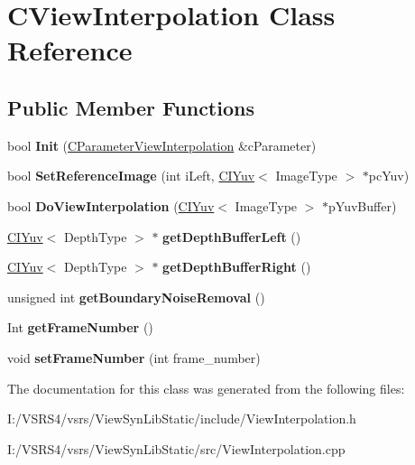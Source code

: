 \hypertarget{class_c_view_interpolation}{}\section{C\+View\+Interpolation Class Reference}
\label{class_c_view_interpolation}
\subsection*{Public Member Functions}
\begin{DoxyCompactItemize}
\item 
\mbox{\label{class_c_view_interpolation_a6880b1f44b9e895e884a079ee116e186}} 
bool {\bfseries Init} (\hyperlink{class_c_parameter_view_interpolation}{C\+Parameter\+View\+Interpolation} \&c\+Parameter)
\item 
\mbox{\label{class_c_view_interpolation_ac6fcdc3971b4023c7ea8932680c82f40}} 
bool {\bfseries Set\+Reference\+Image} (int i\+Left, \hyperlink{class_c_i_yuv}{C\+I\+Yuv}$<$ Image\+Type $>$ $\ast$pc\+Yuv)
\item 
\mbox{\label{class_c_view_interpolation_a5ae50ca08408d1a388dc607b65896d46}} 
bool {\bfseries Do\+View\+Interpolation} (\hyperlink{class_c_i_yuv}{C\+I\+Yuv}$<$ Image\+Type $>$ $\ast$p\+Yuv\+Buffer)
\item 
\mbox{\label{class_c_view_interpolation_a70574d7efb5a1a83308644db864341f5}} 
\hyperlink{class_c_i_yuv}{C\+I\+Yuv}$<$ Depth\+Type $>$ $\ast$ {\bfseries get\+Depth\+Buffer\+Left} ()
\item 
\mbox{\label{class_c_view_interpolation_a8128239185bdf5a1cef0849fa1743f55}} 
\hyperlink{class_c_i_yuv}{C\+I\+Yuv}$<$ Depth\+Type $>$ $\ast$ {\bfseries get\+Depth\+Buffer\+Right} ()
\item 
\mbox{\label{class_c_view_interpolation_a448b47edb9eb691ee514ef531d484c44}} 
unsigned int {\bfseries get\+Boundary\+Noise\+Removal} ()
\item 
\mbox{\label{class_c_view_interpolation_a02fc74d6bf654a9764a6f9dd4f43328e}} 
Int {\bfseries get\+Frame\+Number} ()
\item 
\mbox{\label{class_c_view_interpolation_a35e9c01ad96fd36f371728d83329423e}} 
void {\bfseries set\+Frame\+Number} (int frame\+\_\+number)
\end{DoxyCompactItemize}


The documentation for this class was generated from the following files\+:\begin{DoxyCompactItemize}
\item 
I\+:/\+V\+S\+R\+S4/vsrs/\+View\+Syn\+Lib\+Static/include/View\+Interpolation.\+h\item 
I\+:/\+V\+S\+R\+S4/vsrs/\+View\+Syn\+Lib\+Static/src/View\+Interpolation.\+cpp\end{DoxyCompactItemize}

